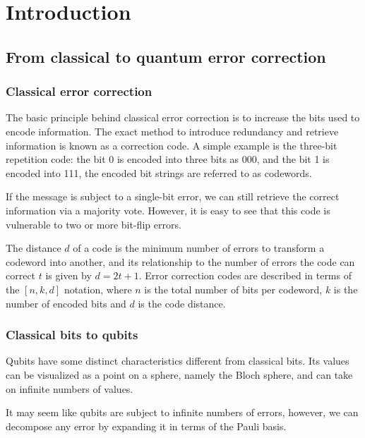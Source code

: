 \documentclass[final,5p,times,twocolumn,authoryear]{elsarticle}
\begin{document}


\section{Introduction}
\label{introduction}

\subsection{From classical to quantum error correction}

\subsubsection{Classical error correction}

The basic principle behind classical error correction is to increase the bits used to encode information. The exact method to introduce redundancy and retrieve information is known as a correction code. A simple example is the three-bit repetition code: the bit 0 is encoded into three bits as 000, and the bit 1 is encoded into 111, the encoded bit strings are referred to as codewords.

If the message is subject to a single-bit error, we can still retrieve the correct information via a majority vote. However, it is easy to see that this code is vulnerable to two or more bit-flip errors.

The distance $d$ of a code is the minimum number of errors to transform a codeword into another, and its relationship to the number of errors the code can correct $t$ is given by $d=2t+1$. Error correction codes are described in terms of the $[n,k,d]$ notation, where $n$ is the total number of bits per codeword, $k$ is the number of encoded bits and $d$ is the code distance.

\subsubsection{Classical bits to qubits}

Qubits have some distinct characteristics different from classical bits. Its values can be visualized as a point on a sphere, namely the Bloch sphere, and can take on infinite numbers of values.

It may seem like qubits are subject to infinite numbers of errors, however, we can decompose any error by expanding it in terms of the Pauli basis.
\end{document}
